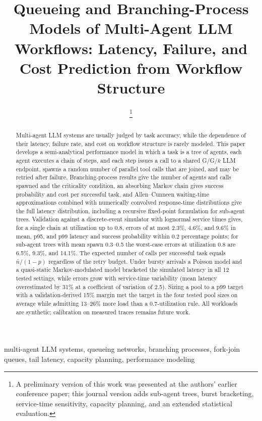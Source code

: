 \documentclass[journal]{IEEEtran}
\begin{document}
\title{Queueing and Branching-Process Models of Multi-Agent LLM Workflows: Latency, Failure, and Cost Prediction from Workflow Structure}
\author{
\thanks{A preliminary version of this work was presented at the authors' earlier conference paper; this journal version adds sub-agent trees, burst bracketing, service-time sensitivity, capacity planning, and an extended statistical evaluation.}}
\maketitle
\begin{abstract}
Multi-agent LLM systems are usually judged by task accuracy, while the dependence of their latency, failure rate, and cost on workflow structure is rarely modeled. This paper develops a semi-analytical performance model in which a task is a tree of agents, each agent executes a chain of steps, and each step issues a call to a shared G/G/$k$ LLM endpoint, spawns a random number of parallel tool calls that are joined, and may be retried after failure. Branching-process results give the number of agents and calls spawned and the criticality condition, an absorbing Markov chain gives success probability and cost per successful task, and Allen--Cunneen waiting-time approximations combined with numerically convolved response-time distributions give the full latency distribution, including a recursive fixed-point formulation for sub-agent trees. Validation against a discrete-event simulator with lognormal service times gives, for a single chain at utilization up to 0.8, errors of at most 2.3\%, 4.6\%, and 9.6\% in mean, p95, and p99 latency and success probability within 0.2 percentage points; for sub-agent trees with mean spawn 0.3--0.5 the worst-case errors at utilization 0.8 are 6.5\%, 9.3\%, and 14.1\%. The expected number of calls per successful task equals $\bar n/(1-p)$ regardless of the retry budget. Under bursty arrivals a Poisson model and a quasi-static Markov-modulated model bracketed the simulated latency in all 12 tested settings, while errors grow with service-time variability (mean latency overestimated by 31\% at a coefficient of variation of 2.5). Sizing a pool to a p99 target with a validation-derived 15\% margin met the target in the four tested pool sizes on average while admitting 13--26\% more load than a 0.7-utilization rule. All workloads are synthetic; calibration on measured traces remains future work.
\end{abstract}
\begin{IEEEkeywords}
multi-agent LLM systems, queueing networks, branching processes, fork-join queues, tail latency, capacity planning, performance modeling
\end{IEEEkeywords}
\end{document}
